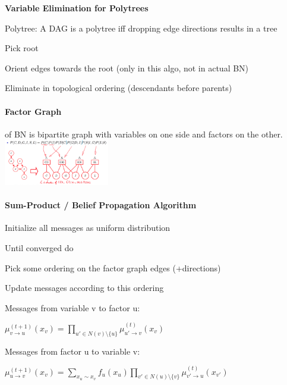 \documentclass[a4paper, 10pt]{scrartcl}
\begin{document}
\begin{multicols*}{3}
\begin{compactitem}
	\end{compactitem}

		
	\textbf{Variable Elimination for Polytrees}
	
	Polytree: A DAG is a polytree iff dropping edge directions results in a tree
	\begin{compactitem}
		\item Pick root
		\item Orient edges towards the root (only in this algo, not in actual BN)
		\item Eliminate in topological ordering (descendants before parents)
	\end{compactitem}

	\paragraph{Factor Graph}
	of BN is bipartite graph with variables on one side and factors on the other.
	\includegraphics[height=2cm]{img/pai2.png}
	
	\paragraph{Sum-Product / Belief Propagation Algorithm}	
	
	\begin{compactitem}
		\item Initialize all messages as uniform distribution  
		\item Until converged do
		\begin{compactenum}
			\item Pick some ordering on the factor graph edges (+directions)   
			\item Update messages according to this ordering
			
			Messages from variable v to factor u: 
			
			$\mu^{(t+1)}_{v \rightarrow u}(x_v) = \prod_{u' \in N(v) \setminus \{u\}} \mu^{(t)}_{u' \rightarrow v}(x_{v})$ 
			
			Messages from factor u to variable v:
			
			$\mu^{(t+1)}_{u \rightarrow v}(x_v) = \sum_{x_u \sim x_v} f_u(x_u) \prod_{v' \in N(u) \setminus \{v\}} \mu^{(t)}_{v' \rightarrow u}(x_{v'})$ 


\end{compactenum}
\end{compactitem}
\end{multicols*}
\end{document}
